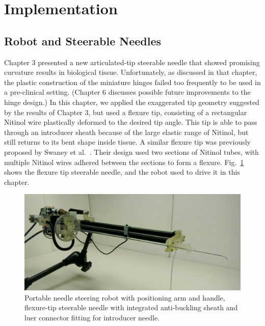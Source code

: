 \section{Implementation}
\label{sec:HumanInTheLoopImplementation}

\subsection{Robot and Steerable Needles}
\label{sec:NS2RobotAndNeedle}
Chapter 3 presented a new articulated-tip steerable needle that showed promising curvature results in biological tissue. Unfortunately, as discussed in that chapter, the plastic construction of the miniature hinges failed too frequently to be used in a pre-clinical setting. (Chapter 6 discusses possible future improvements to the hinge design.) In this chapter, we applied the exaggerated tip geometry suggested by the results of Chapter 3, but used a flexure tip, consisting of a rectangular Nitinol wire plastically deformed to the desired tip angle. This tip is able to pass through an introducer sheath because of the large elastic range of Nitinol, but still returns to its bent shape inside tissue. A similar flexure tip was previously proposed by Swaney et al.~\cite{Swaney2013}. Their design used two sections of Nitinol tubes, with multiple Nitinol wires adhered between the sections to form a flexure. Fig.~\ref{fig:NS2AndNeedle} shows the flexure tip steerable needle, and the robot used to drive it in this chapter.

\begin{figure}[!t]
\centering
\includegraphics[width = \columnwidth]{./Images/Chapter5/NS2RobotAndNeedle/NS2RobotAndNeedle.jpg}%
\caption[Robot and flexure-tip steerable needles]{Portable needle steering robot with positioning arm and handle, flexure-tip steerable needle with integrated anti-buckling sheath and luer connector fitting for introducer needle.}
\label{fig:NS2AndNeedle}
\end{figure} 

